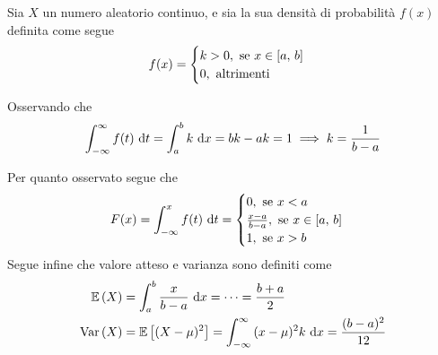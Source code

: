 \documentclass{subfiles}
\begin{document}
Sia \(X\) un numero aleatorio continuo, e sia la sua densità di probabilità \(f(x)\) definita come segue
\[
    f(x) = \begin{cases}
        k > 0, \text{se} x \in \Range*{a}{b} \\
        0, \text{altrimenti}
    \end{cases}\]
\begin{Remark*}
    Osservando che
    \[
        \Int{f(t)}{t}[-\infty][\infty] = \Int{k}{x}[a][b] = bk - ak = 1  \implies k = \Frac{1}{b - a}
    \]
\end{Remark*}
Per quanto osservato segue che
\[
    F(x) = \Int{f(t)}{t}[-\infty][x] = \begin{cases}
        0, \text{se} x < a                                 \\
        \Frac{x - a}{b - a}, \text{se} x \in \Range*{a}{b} \\
        1, \text{se} x > b
    \end{cases}\]
Segue infine che valore atteso e varianza sono definiti come
\[\begin{aligned}
        \Expected{X} & = \Int{\Frac{x}{b - a}}{x}[a][b] = \cdots = \Frac{b + a}{2}                                      \\
        \Var{X}      & = \Expected*{(X - \mu)^{2}} = \Int{(x - \mu)^{2} k}{x}[-\infty][\infty] = \Frac{(b - a)^{2}}{12}
    \end{aligned}\]
\end{document}
